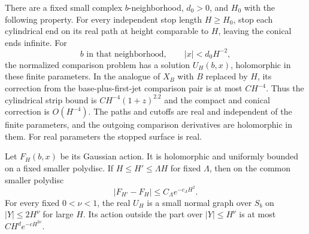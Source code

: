 \begin{lemma}\label{arr:real-stops}
There are a fixed small complex $b$-neighborhood, $d_0>0$, and $H_0$
with the following property.  For every independent stop length
$H\ge H_0$, stop each cylindrical end on its real path at height
comparable to $H$, leaving the conical ends infinite.  For
\[
 b\text{ in that neighborhood},\qquad |x|<d_0H^{-2},
\]
the normalized comparison problem has a solution $U_H(b,x)$,
holomorphic in these finite parameters.  In the analogue of $X_B$
with $B$ replaced by $H$, its correction from the base-plus-first-jet
comparison pair is at most $C H^{-4}$.  Thus the cylindrical strip
bound is $C H^{-4}(1+z)^{2.2}$ and the compact and conical correction
is $O(H^{-4})$.  The paths and cutoffs are real and independent of the
finite parameters, and the outgoing comparison derivatives are
holomorphic in them.  For real parameters the stopped surface is real.

Let $F_H(b,x)$ be its Gaussian action.  It is holomorphic and uniformly bounded on a
fixed smaller polydisc.  If $H\le H'\le\Lambda H$ for fixed $\Lambda$,
then on the common smaller polydisc
\begin{equation}\label{arr:real-stop-difference}
 |F_{H'}-F_H|\le C_\Lambda e^{-c_\Lambda H^2}.
\end{equation}
For every fixed $0<\nu<1$, the real $U_H$ is a small normal graph over
$S_b$ on $|Y|\le2H^\nu$ for large $H$.  Its action outside the part
over $|Y|\le H^\nu$ is at most
$C H^d e^{-cH^{2\nu}}$.
\end{lemma}

